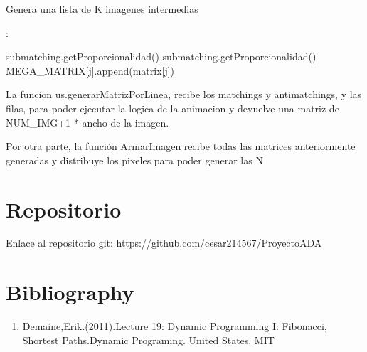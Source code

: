 \documentclass{article}
\begin{document}
\begin{algorithm}
\caption{Genera una lista de K imagenes intermedias }
\begin{algorithmic}[1]
:
    \EndFor

            \State submatching.getProporcionalidad()
        \EndFor
            \State submatching.getProporcionalidad()
        \EndFor
            \State MEGA\_MATRIX[j].append(matrix[j])
        \EndFor
    \EndFor

\end{algorithmic}
\end{algorithm}

La funcion us.generarMatrizPorLinea, recibe los matchings y antimatchings, y las filas, para poder ejecutar la logica de la animacion y devuelve una matriz de NUM\_IMG+1 * ancho de la imagen. 

Por otra parte, la función ArmarImagen recibe todas las matrices anteriormente generadas y distribuye los pixeles para poder generar las N

\section{Repositorio}
Enlace al repositorio git:
https://github.com/cesar214567/ProyectoADA 




\section{Bibliography}
\begin{enumerate}
    \item Demaine,Erik.(2011).Lecture 19: Dynamic Programming I: Fibonacci, Shortest Paths.Dynamic Programing. United States. MIT
\end{enumerate}
\end{document}
